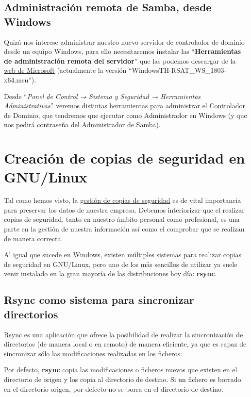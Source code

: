 \section{Administración remota de Samba, desde Windows}
Quizá nos interese administrar nuestro nuevo servidor de controlador de dominio desde un equipo Windows, para ello necesitaremos instalar las “\textbf{Herramientas de administración remota del servidor}” que las podemos descargar de la \href{https://www.microsoft.com/es-es/download/details.aspx?id=45520}{web de Microsoft} (actualmente la versión “WindowsTH-RSAT\_WS\_1803-x64.msu”).

Desde “\textit{Panel de Control → Sistema y Seguridad → Herramientas Administrativas}” veremos distintas herramientas para administrar el Controlador de Dominio, que tendremos que ejecutar como Administrador en Windows (y que nos pedirá contraseña del Administrador de Samba).

\chapter{Creación de copias de seguridad en GNU/Linux}
Tal como hemos visto, la \hyperlink{gestion_copias_de_seguridad}{gestión de copias de seguridad} es de vital importancia para preservar los datos de nuestra empresa. Debemos interiorizar que el realizar copias de seguridad, tanto en nuestro ámbito personal como profesional, es una parte en la gestión de nuestra información así como el comprobar que se realizan de manera correcta.

Al igual que sucede en Windows, existen múltiples sistemas para realizar copias de seguridad en GNU/Linux, pero uno de los más sencillos de utilizar ya suele venir instalado en la gran mayoría de las distribuciones hoy día: \textbf{rsync}.


\section{Rsync como sistema para sincronizar directorios}
Rsync es una aplicación que ofrece la posibilidad de realizar la sincronización de directorios (de manera local o en remoto) de manera eficiente, ya que es capaz de sincronizar sólo las modificaciones realizadas en los ficheros.

Por defecto, \textbf{rsync} copia las modificaciones o ficheros nuevos que existen en el directorio de origen y los copia al directorio de destino. Si un fichero es borrado en el directorio origen, por defecto no se borra en el directorio de destino.

